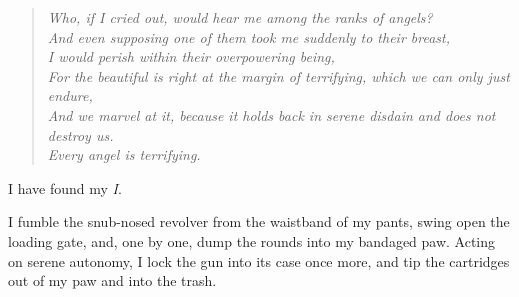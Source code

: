 \begin{verse}
\emph{Who, if I cried out, would hear me among the ranks of angels?\\
And even supposing one of them took me suddenly to their breast,\\
I would perish within their overpowering being,\\
For the beautiful is right at the margin of terrifying, which we can only just endure,\\
And we marvel at it, because it holds back in serene disdain and does not destroy us.\\
Every angel is terrifying.}
\end{verse}

I have found my \emph{I}.

I fumble the snub-nosed revolver from the waistband of my pants, swing open the loading gate, and, one by one, dump the rounds into my bandaged paw. Acting on serene autonomy, I lock the gun into its case once more, and tip the cartridges out of my paw and into the trash.
